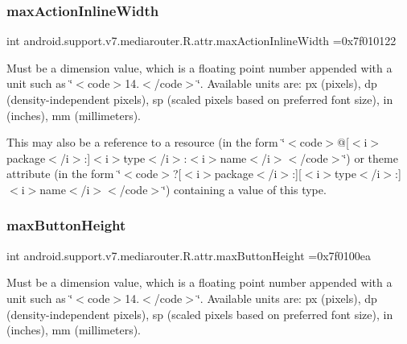 \subsubsection{\texorpdfstring{max\+Action\+Inline\+Width}{maxActionInlineWidth}}
{\footnotesize\ttfamily int android.\+support.\+v7.\+mediarouter.\+R.\+attr.\+max\+Action\+Inline\+Width =0x7f010122\hspace{0.3cm}{\ttfamily [static]}}

Must be a dimension value, which is a floating point number appended with a unit such as \char`\"{}$<$code$>$14.\+5sp$<$/code$>$\char`\"{}. Available units are\+: px (pixels), dp (density-\/independent pixels), sp (scaled pixels based on preferred font size), in (inches), mm (millimeters). 

This may also be a reference to a resource (in the form \char`\"{}$<$code$>$@\mbox{[}$<$i$>$package$<$/i$>$\+:\mbox{]}$<$i$>$type$<$/i$>$\+:$<$i$>$name$<$/i$>$$<$/code$>$\char`\"{}) or theme attribute (in the form \char`\"{}$<$code$>$?\mbox{[}$<$i$>$package$<$/i$>$\+:\mbox{]}\mbox{[}$<$i$>$type$<$/i$>$\+:\mbox{]}$<$i$>$name$<$/i$>$$<$/code$>$\char`\"{}) containing a value of this type. \mbox{\label{classandroid_1_1support_1_1v7_1_1mediarouter_1_1R_1_1attr_afa356a4dee8535ed3f96158d489bb1c3}} 
\subsubsection{\texorpdfstring{max\+Button\+Height}{maxButtonHeight}}
{\footnotesize\ttfamily int android.\+support.\+v7.\+mediarouter.\+R.\+attr.\+max\+Button\+Height =0x7f0100ea\hspace{0.3cm}{\ttfamily [static]}}

Must be a dimension value, which is a floating point number appended with a unit such as \char`\"{}$<$code$>$14.\+5sp$<$/code$>$\char`\"{}. Available units are\+: px (pixels), dp (density-\/independent pixels), sp (scaled pixels based on preferred font size), in (inches), mm (millimeters). 

